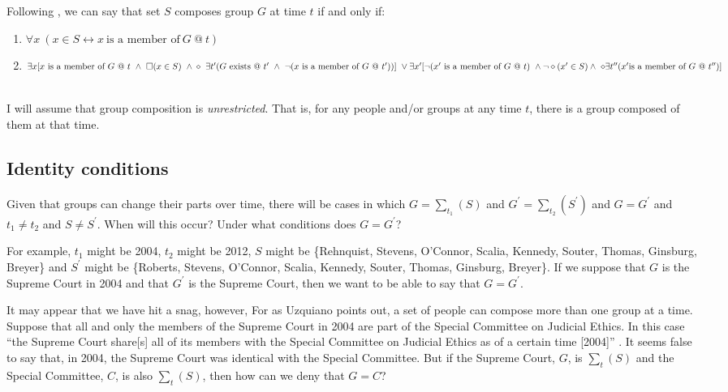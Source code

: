 \documentclass[11pt]{article}
\begin{document}
\begin{spacing}{1.5}
Following \citet{uzquiano2004a}, we can say that set $S$
composes group $G$ at time $t$ if and only if:

\begin{enumerate}[label=(\arabic*)]
  \item $\forall x\ (x \in S \leftrightarrow x\ \text{is a member of}\ G
  \  @\ t)$
  \item $\exists x {[} x\ \text{is a member
      of}\ G\ @\ t\ \wedge\ \square ( x \in S )\ \wedge
    \\ \diamond\ \exists t^{\prime} ( G\ \text{exists}\ @
    \ t^{\prime}\ \wedge\ \neg ( x\ \text{is a member
      of}\ G\ @\ t^{\prime} )) {]}\ \vee \\ \exists x^{\prime} {[}
    \neg ( x^{\prime}\ \text{is a member of}\ G\ @\ t)\ \wedge \\ \neg
    \diamond (x^{\prime} \in S ) \wedge \ \diamond \exists t^{\prime
      \prime} (x^{\prime} \text{is a member of}\ G\ @\ t^{\prime
      \prime}) {]}$\ \citeyearpar[150]{uzquiano2004a}
\end{enumerate}

I will assume that group composition is {\em unrestricted}.  That is,
for any people and/or groups at any time $t$, there is a group
composed of them at that time.

\subsection{Identity conditions}
\label{group-id}
Given that groups can change their parts over time, there will be
cases in which $G = \sum _{t_1} ( S )$ and $G^{\prime} = \sum _{t_2}
( S^{\prime} )$ and $G = G^{\prime}$ and $t_1 \neq t_2$ and $S \neq
S^{\prime}$.  When will this occur?  Under what conditions does $G =
G^{\prime}$?

For example, $t_1$ might be 2004, $t_2$ might be 2012, $S$ might be
\{Rehnquist, Stevens, O'Connor, Scalia, Kennedy, Souter, Thomas,
Ginsburg, Breyer\} and $S^{\prime}$ might be \{Roberts, Stevens,
O'Connor, Scalia, Kennedy, Souter, Thomas, Ginsburg, Breyer\}.  If we
suppose that $G$ is the Supreme Court in 2004 and that $G^{\prime}$
is the Supreme Court, then we want to be able to say that $G =
G^{\prime}$.  

It may appear that we have hit a snag, however, For as Uzquiano points
out, a set of people can compose more than one group at a time.
Suppose that all and only the members of the Supreme Court in 2004 are
part of the Special Committee on Judicial Ethics.  In this case ``the
Supreme Court share[s] all of its members with the Special Committee
on Judicial Ethics as of a certain time [2004]''
\citep[151]{uzquiano2004a}.  It seems false to say that, in 2004, the
Supreme Court was identical with the Special Committee.  But if the
Supreme Court, $G$, is $\sum _{t} ( S )$ and the Special Committee,
$C$, is also $\sum _{t} ( S )$, then how can we deny that $G = C$?


\end{spacing}
\end{document}
